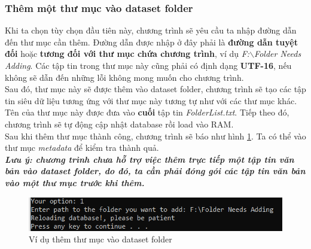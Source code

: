 \documentclass[12pt,a4paper]{article}
\begin{document}
\subsubsection{Thêm một thư mục vào dataset folder}
Khi ta chọn tùy chọn đầu tiên này, chương trình sẽ yêu cầu ta nhập đường dẫn đến thư mục cần thêm. Đường dẫn được nhập ở đây phải là \textbf{đường dẫn tuyệt đối} hoặc \textbf{tương đối với thư mục chứa chương trình}, ví dụ \textit{F:\(\backslash\)Folder Needs Adding}. Các tập tin trong thư mục này cũng phải có định dạng \textbf{UTF-16}, nếu không sẽ dẫn đến những lỗi không mong muốn cho chương trình.\\
Sau đó, thư mục này sẽ được thêm vào dataset folder, chương trình sẽ tạo các tập tin siêu dữ liệu tương ứng với thư mục này tương tự như với các thư mục khác. Tên của thư mục này được đưa vào \textbf{cuối} tập tin \textit{FolderList.txt}. Tiếp theo đó, chương trình sẽ tự động cập nhật database rồi load vào RAM.\\
Sau khi thêm thư mục thành công, chương trình sẽ báo như hình \ref{Fig19}. Ta có thể vào thư mục \textit{metadata} để kiểm tra thành quả.\\
\textbf{\textit{Lưu ý: chương trình chưa hỗ trợ việc thêm trực tiếp một tập tin văn bản vào dataset folder, do đó, ta cần phải đóng gói các tập tin văn bản vào một thư mục trước khi thêm.}}
\begin{figure}[H]
\begin{center}
\includegraphics[scale=1]{Fig19}
\end{center}
\caption{Ví dụ thêm thư mục vào dataset folder}
\label{Fig19}
\end{figure}
\end{document}
